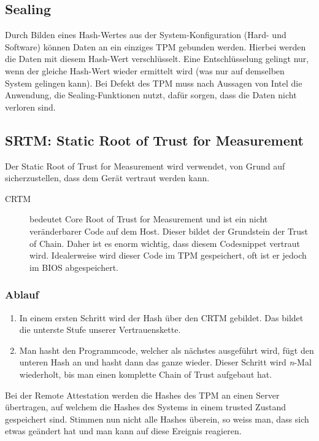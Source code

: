 \subsection{Sealing}
Durch Bilden eines Hash-Wertes aus der System-Konfiguration (Hard- und Software) können Daten an ein einziges TPM gebunden werden. Hierbei werden die Daten mit diesem Hash-Wert verschlüsselt. Eine Entschlüsselung gelingt nur, wenn der gleiche Hash-Wert wieder ermittelt wird (was nur auf demselben System gelingen kann). Bei Defekt des TPM muss nach Aussagen von Intel die Anwendung, die Sealing-Funktionen nutzt, dafür sorgen, dass die Daten nicht verloren sind.


\subsection{SRTM: Static Root of Trust for Measurement}
Der Static Root of Trust for Measurement wird verwendet, von Grund auf sicherzustellen, dass dem Gerät vertraut werden kann.
\begin{description}
    \item[CRTM] bedeutet Core Root of Trust for Measurement und ist ein nicht veränderbarer Code auf dem Host. Dieser bildet der Grundstein der Trust of Chain. Daher ist es enorm wichtig, dass diesem Codesnippet vertraut wird. Idealerweise wird dieser Code im TPM gespeichert, oft ist er jedoch im BIOS abgespeichert.
    \item[]
\end{description}

\subsubsection{Ablauf}
\begin{enumerate}
    \item In einem ersten Schritt wird der Hash über den CRTM gebildet. Das bildet die unterste Stufe unserer Vertrauenskette.
    \item Man hasht den Programmcode, welcher als nächstes ausgeführt wird, fügt den unteren Hash an und hasht dann das ganze wieder. Dieser Schritt wird \textit{n}-Mal wiederholt, bis man einen komplette Chain of Trust aufgebaut hat.
\end{enumerate}
Bei der Remote Attestation werden die Hashes des TPM an einen Server übertragen, auf welchem die Hashes des Systems in einem trusted Zustand gespeichert sind. Stimmen nun nicht alle Hashes überein, so weiss man, dass sich etwas geändert hat und man kann auf diese Ereignis reagieren.



